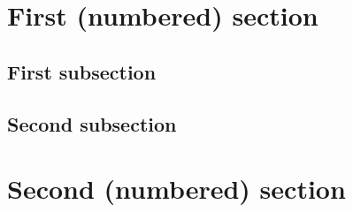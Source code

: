 {  \section{First (numbered) section}\label{sec:first-numbered-\languagename}
  \lipsum[2]
  \subsection{First subsection}
  \lipsum[3-8]
  \subsection{Second subsection}
  \lipsum[9-15]
  \section{Second (numbered) section}
  \lipsum[16-38]
  \printbibliography
}
